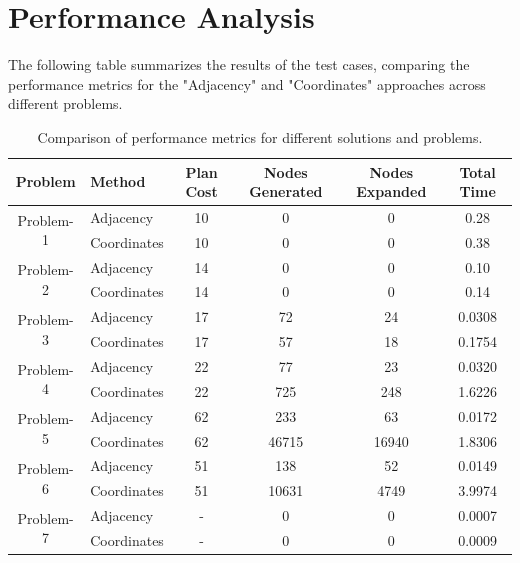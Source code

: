 \documentclass{article}
\begin{document}
\section{Performance Analysis}

The following table summarizes the results of the test cases, comparing the performance metrics for the "Adjacency" and "Coordinates" approaches across different problems.

\begin{table}[ht]
    \centering
    \small
    \begin{tabular}{|c|l|c|c|c|c|}
        \hline
        \textbf{Problem} & \textbf{Method} & \textbf{Plan Cost} & \textbf{Nodes Generated} & \textbf{Nodes Expanded} & \textbf{Total Time} \\
        \hline
        \multirow{2}{*}{Problem-1} & Adjacency & 10 & 0 & 0 & 0.28 \\
                                   & Coordinates & 10 & 0 & 0 & 0.38 \\
        \hline
        \multirow{2}{*}{Problem-2} & Adjacency & 14 & 0 & 0 & 0.10 \\
                                   & Coordinates & 14 & 0 & 0 & 0.14 \\
        \hline
        \multirow{2}{*}{Problem-3} & Adjacency & 17 & 72 & 24 & 0.0308 \\
                                   & Coordinates & 17 & 57 & 18 & 0.1754 \\
        \hline
        \multirow{2}{*}{Problem-4} & Adjacency & 22 & 77 & 23 & 0.0320 \\
                                   & Coordinates & 22 & 725 & 248 & 1.6226 \\
        \hline
        \multirow{2}{*}{Problem-5} & Adjacency & 62 & 233 & 63 & 0.0172 \\
                                   & Coordinates & 62 & 46715 & 16940 & 1.8306 \\
        \hline
        \multirow{2}{*}{Problem-6} & Adjacency & 51 & 138 & 52 & 0.0149 \\
                                   & Coordinates & 51 & 10631 & 4749 & 3.9974 \\
        \hline
        \multirow{2}{*}{Problem-7} & Adjacency & - & 0 & 0 & 0.0007 \\
                                   & Coordinates & - & 0 & 0 & 0.0009 \\
        \hline
    \end{tabular}
    \caption{Comparison of performance metrics for different solutions and problems.}
    \label{tab:results}
\end{table}
\end{document}
